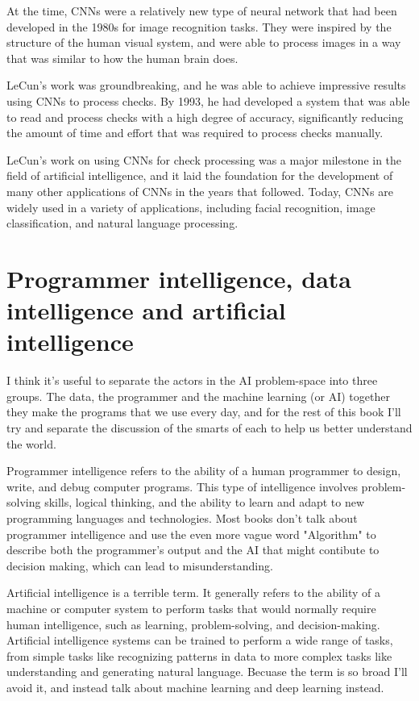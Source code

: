 At the time, CNNs were a relatively new type of neural network that had been developed in the 1980s for image recognition tasks. They were inspired by the structure of the human visual system, and were able to process images in a way that was similar to how the human brain does.

LeCun's work was groundbreaking, and he was able to achieve impressive results using CNNs to process checks. By 1993, he had developed a system that was able to read and process checks with a high degree of accuracy, significantly reducing the amount of time and effort that was required to process checks manually.

LeCun's work on using CNNs for check processing was a major milestone in the field of artificial intelligence, and it laid the foundation for the development of many other applications of CNNs in the years that followed. Today, CNNs are widely used in a variety of applications, including facial recognition, image classification, and natural language processing. 

\section{Programmer intelligence, data intelligence and artificial intelligence}

I think it's useful to separate the actors in the AI problem-space into three groups. The data, the programmer and the machine learning (or AI) together they make the programs that we use every day, and for the rest of this book I'll try and separate the discussion of the smarts of each to help us better understand the world. 

Programmer intelligence refers to the ability of a human programmer to design, write, and debug computer programs. This type of intelligence involves problem-solving skills, logical thinking, and the ability to learn and adapt to new programming languages and technologies. Most books don't talk about programmer intelligence and use the even more vague word "Algorithm" to describe both the programmer's output and the AI that might contibute to decision making, which can lead to misunderstanding.

Artificial intelligence is a terrible term. It generally refers to the ability of a machine or computer system to perform tasks that would normally require human intelligence, such as learning, problem-solving, and decision-making. Artificial intelligence systems can be trained to perform a wide range of tasks, from simple tasks like recognizing patterns in data to more complex tasks like understanding and generating natural language. Becuase the term is so broad I'll avoid it, and instead talk about machine learning and deep learning instead. 

